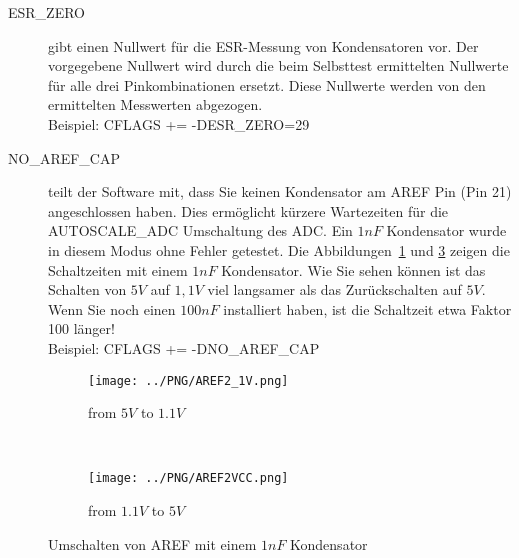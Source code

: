 \begin{description}
  \item[ESR\_ZERO] gibt einen Nullwert für die ESR-Messung von Kondensatoren vor.
Der vorgegebene Nullwert wird durch die beim Selbsttest ermittelten Nullwerte für alle drei Pinkombinationen ersetzt.
 Diese Nullwerte werden von den ermittelten Messwerten abgezogen.\\
Beispiel: CFLAGS += -DESR\_ZERO=29

  \item[NO\_AREF\_CAP] teilt der Software mit, dass Sie keinen Kondensator am AREF Pin (Pin 21) angeschlossen haben.
Dies ermöglicht kürzere Wartezeiten für die AUTOSCALE\_ADC Umschaltung des ADC.
Ein \(1nF\) Kondensator wurde in diesem Modus ohne Fehler getestet.
Die Abbildungen~\ref{pic:aref1} und \ref{pic:aref5} zeigen die Schaltzeiten mit einem \(1nF\) Kondensator.
Wie Sie sehen können ist das Schalten von \(5V\) auf \(1,1V\) viel langsamer als das Zurückschalten auf \(5V\).
Wenn Sie noch einen \(100nF\) installiert haben, ist die Schaltzeit etwa Faktor 100 länger!\\
Beispiel: CFLAGS += -DNO\_AREF\_CAP

\end{description}

\begin{figure}[H]
  \begin{subfigure}[b]{.5\textwidth}
    \centering
    \texttt{[image: ../PNG/AREF2\_1V.png]}
    \caption{from \(5V\) to \(1.1V\) }
    \label{pic:aref1}
  \end{subfigure}
  ~
  \begin{subfigure}[b]{.5\textwidth}
    \centering
    \texttt{[image: ../PNG/AREF2VCC.png]}
    \caption{from \(1.1V\) to \(5V\)}
    \label{pic:aref5}
  \end{subfigure}
  \caption{Umschalten von AREF mit einem \(1nF\) Kondensator}
\end{figure}

